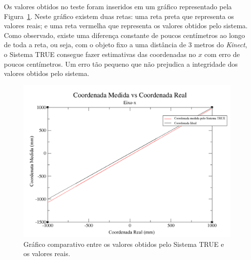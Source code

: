 	Os valores obtidos no teste foram inseridos em um gráfico representado pela
	Figura~\ref{fig:grafico-eixox}. Neste gráfico existem duas retas: uma reta
	preta que representa os valores reais; e uma reta vermelha que representa os
	valores obtidos pelo sistema. Como observado, existe uma diferença constante de
	poucos centímetros ao longo de toda a reta, ou seja, com o objeto fixo a uma
	distância de 3 metros do \textit{Kinect}, o Sistema TRUE consegue fazer
	estimativas das coordenadas no $\displaystyle x$ com erro de poucos
	centímetros. Um erro tão pequeno que não prejudica a integridade dos valores
	obtidos pelo sistema.

	\begin{figure}[htb]
		\begin{center}
			\includegraphics[scale=0.4]{figuras/5.Testes/grafico-eixo-x.png}
		\end{center}
		\caption{Gráfico comparativo entre os valores obtidos pelo Sistema TRUE e os valores reais.}
		\label{fig:grafico-eixox}
	\end{figure}

































